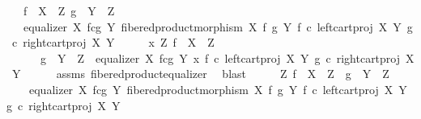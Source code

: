 \begin{isabellebody}
\ \ \ {\isachardoublequoteopen}f\ {\isacharcolon}{\kern0pt}\ X\ {\isasymrightarrow}\ Z{\isachardoublequoteclose}\ {\isachardoublequoteopen}g\ {\isacharcolon}{\kern0pt}\ Y\ {\isasymrightarrow}\ Z{\isachardoublequoteclose}\isanewline
\ \ \ {\isachardoublequoteopen}equalizer\ {\isacharparenleft}{\kern0pt}X\ \isactrlbsub f\isactrlesub {\isasymtimes}\isactrlsub c\isactrlbsub g\isactrlesub \ Y{\isacharparenright}{\kern0pt}\ {\isacharparenleft}{\kern0pt}fibered{\isacharunderscore}{\kern0pt}product{\isacharunderscore}{\kern0pt}morphism\ X\ f\ g\ Y{\isacharparenright}{\kern0pt}\ {\isacharparenleft}{\kern0pt}f\ {\isasymcirc}\isactrlsub c\ left{\isacharunderscore}{\kern0pt}cart{\isacharunderscore}{\kern0pt}proj\ X\ Y{\isacharparenright}{\kern0pt}\ {\isacharparenleft}{\kern0pt}g\ {\isasymcirc}\isactrlsub c\ right{\isacharunderscore}{\kern0pt}cart{\isacharunderscore}{\kern0pt}proj\ X\ Y{\isacharparenright}{\kern0pt}{\isachardoublequoteclose}\isanewline
%
\isadelimproof
%
\endisadelimproof
%
\isatagproof
{}\isamarkupfalse%
\ {\isacharminus}{\kern0pt}\isanewline
\ \ \isamarkupfalse%
\ {\isachardoublequoteopen}{\isasymexists}x\ Z{\isachardot}{\kern0pt}\ f\ {\isacharcolon}{\kern0pt}\ X\ {\isasymrightarrow}\ Z\ {\isasymand}\isanewline
\ \ \ \ \ \ g\ {\isacharcolon}{\kern0pt}\ Y\ {\isasymrightarrow}\ Z\ {\isasymand}\ equalizer\ {\isacharparenleft}{\kern0pt}X\ \isactrlbsub f\isactrlesub {\isasymtimes}\isactrlsub c\isactrlbsub g\isactrlesub \ Y{\isacharparenright}{\kern0pt}\ x\ {\isacharparenleft}{\kern0pt}f\ {\isasymcirc}\isactrlsub c\ left{\isacharunderscore}{\kern0pt}cart{\isacharunderscore}{\kern0pt}proj\ X\ Y{\isacharparenright}{\kern0pt}\ {\isacharparenleft}{\kern0pt}g\ {\isasymcirc}\isactrlsub c\ right{\isacharunderscore}{\kern0pt}cart{\isacharunderscore}{\kern0pt}proj\ X\ Y{\isacharparenright}{\kern0pt}{\isachardoublequoteclose}\isanewline
\ \ \ \ \isamarkupfalse%
\ assms\ fibered{\isacharunderscore}{\kern0pt}product{\isacharunderscore}{\kern0pt}equalizer\ \isamarkupfalse%
\ blast\isanewline
\ \ \isamarkupfalse%
\ \isamarkupfalse%
\ {\isachardoublequoteopen}{\isasymexists}Z{\isachardot}{\kern0pt}\ f\ {\isacharcolon}{\kern0pt}\ X\ {\isasymrightarrow}\ Z\ {\isasymand}\ g\ {\isacharcolon}{\kern0pt}\ Y\ {\isasymrightarrow}\ Z\ {\isasymand}\isanewline
\ \ \ \ equalizer\ {\isacharparenleft}{\kern0pt}X\ \isactrlbsub f\isactrlesub {\isasymtimes}\isactrlsub c\isactrlbsub g\isactrlesub \ Y{\isacharparenright}{\kern0pt}\ {\isacharparenleft}{\kern0pt}fibered{\isacharunderscore}{\kern0pt}product{\isacharunderscore}{\kern0pt}morphism\ X\ f\ g\ Y{\isacharparenright}{\kern0pt}\ {\isacharparenleft}{\kern0pt}f\ {\isasymcirc}\isactrlsub c\ left{\isacharunderscore}{\kern0pt}cart{\isacharunderscore}{\kern0pt}proj\ X\ Y{\isacharparenright}{\kern0pt}\ {\isacharparenleft}{\kern0pt}g\ {\isasymcirc}\isactrlsub c\ right{\isacharunderscore}{\kern0pt}cart{\isacharunderscore}{\kern0pt}proj\ X\ Y{\isacharparenright}{\kern0pt}{\isachardoublequoteclose}\isanewline

\end{isabellebody}
